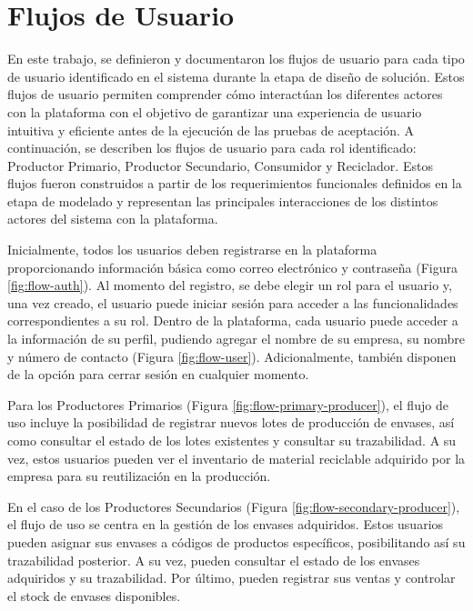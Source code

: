 \chapter{Flujos de Usuario}
\label{cp:user-flows}

\parindent0pt

En este trabajo, se definieron y documentaron los flujos de usuario para cada tipo de usuario identificado en el sistema durante la etapa de diseño de solución. Estos flujos de usuario permiten comprender cómo interactúan los diferentes actores con la plataforma con el objetivo de garantizar una experiencia de usuario intuitiva y eficiente antes de la ejecución de las pruebas de aceptación. A continuación, se describen los flujos de usuario para cada rol identificado: Productor Primario, Productor Secundario, Consumidor y Reciclador. Estos flujos fueron construidos a partir de los requerimientos funcionales definidos en la etapa de modelado y representan las principales interacciones de los distintos actores del sistema con la plataforma.

Inicialmente, todos los usuarios deben registrarse en la plataforma proporcionando información básica como correo electrónico y contraseña (Figura \ref{fig:flow-auth}). Al momento del registro, se debe elegir un rol para el usuario y, una vez creado, el usuario puede iniciar sesión para acceder a las funcionalidades correspondientes a su rol. Dentro de la plataforma, cada usuario puede acceder a la información de su perfil, pudiendo agregar el nombre de su empresa, su nombre y número de contacto (Figura \ref{fig:flow-user}). Adicionalmente, también disponen de la opción para cerrar sesión en cualquier momento.

Para los Productores Primarios (Figura \ref{fig:flow-primary-producer}), el flujo de uso incluye la posibilidad de registrar nuevos lotes de producción de envases, así como consultar el estado de los lotes existentes y consultar su trazabilidad. A su vez, estos usuarios pueden ver el inventario de material reciclable adquirido por la empresa para su reutilización en la producción.

En el caso de los Productores Secundarios (Figura \ref{fig:flow-secondary-producer}), el flujo de uso se centra en la gestión de los envases adquiridos. Estos usuarios pueden asignar sus envases a códigos de productos específicos, posibilitando así su trazabilidad posterior. A su vez, pueden consultar el estado de los envases adquiridos y su trazabilidad. Por último, pueden registrar sus ventas y controlar el stock de envases disponibles.

